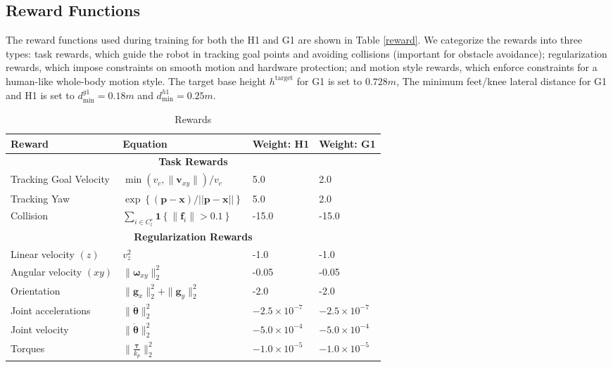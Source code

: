 \clearpage
\newpage
\onecolumn
\begin{appendices}
\section{Reward Functions}
The reward functions used during training for both the H1 and G1 are shown in Table \ref{reward}. We categorize the rewards into three types: task rewards, which guide the robot in tracking goal points and avoiding collisions (important for obstacle avoidance); regularization rewards, which impose constraints on smooth motion and hardware protection; and motion style rewards, which enforce constraints for a human-like whole-body motion style. The target base height $h^{\text {target}}$ for G1 is set to $0.728m$, The minimum feet/knee lateral distance for G1 and H1 is set to $d_\text{min}^{g1} = 0.18m$ and $d_\text{min}^{h1} = 0.25m$.
\begin{table*}[!h]
    \centering
    \caption{Rewards}
    \begin{tabular}{llll}
    \toprule[1.5pt] Reward & Equation & Weight: H1 & Weight: G1 \\ \midrule[1.5pt] 
    \multicolumn{4}{c}{\textbf{Task Rewards}} \\ [0.4ex]
    Tracking Goal Velocity & $\min(v_{c},\|\mathbf{v}_{x y}\|)/v_{c}$ & 5.0 & 2.0 \\[0.4ex]
    Tracking Yaw & $\exp \left\{(\textbf{p} - \textbf{x}) / ||\textbf{p} - \textbf{x}|| \right\}$ & 5.0 & 2.0\\[0.4ex]
    Collision & $\sum_{i\in C_l^e}{\bm{1}}\left\{\|\mathbf{f}_i \|>0.1\right \}$ & -15.0 & -15.0 \\[0.4ex]
    \toprule[1.0pt] \multicolumn{4}{c}{\textbf{Regularization Rewards}} \\ [0.4ex]
    Linear velocity $(z)$ & $v_z^2$ & -1.0 & -1.0\\ [0.4ex]
    Angular velocity $(x y)$ & $\|\boldsymbol{\omega}_{x y}\|_2^2$ & -0.05 & -0.05\\[0.4ex]
    Orientation & $\|\mathbf{g}_{x}\|_2^2 + \|\mathbf{g}_{y}\|_2^2$ & -2.0 & -2.0\\[0.4ex]
    Joint accelerations & $\|\ddot{\boldsymbol{\theta}}\|_2^2$ & $-2.5 \times 10^{-7}$ & $-2.5 \times 10^{-7}$\\[0.4ex]
    Joint velocity & $\|\dot{\boldsymbol{\theta}}\|_{2}^{2}$ & $-5.0 \times 10^{-4}$ & $-5.0 \times 10^{-4}$\\ [0.4ex]
    Torques & $\|\frac{\boldsymbol{\tau}}{k_p}\|_{2}^{2}$ & $-1.0 \times 10^{-5}$ & $-1.0 \times 10^{-5}$\\[0.4ex]

\end{tabular}
\end{table*}
\end{appendices}
